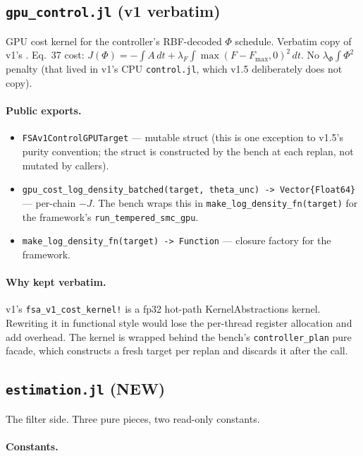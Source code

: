 \documentclass[11pt,a4paper]{article}
\begin{document}
\subsection{\texttt{gpu\_control.jl} (v1 verbatim)}

GPU cost kernel for the controller's RBF-decoded $\Phi$ schedule.
Verbatim copy of v1's . Eq.~37 cost: $J(\Phi)
= -\int A\,dt + \lambda_F \int \max(F - F_{\max}, 0)^2\,dt$. No
$\lambda_\Phi \int \Phi^2$ penalty (that lived in v1's CPU
\texttt{control.jl}, which v1.5 deliberately does not copy).

\paragraph{Public exports.}

\begin{itemize}[itemsep=2pt,leftmargin=*]
\item \texttt{FSAv1ControlGPUTarget} --- mutable struct (this is one
  exception to v1.5's purity convention; the struct is constructed
  by the bench at each replan, not mutated by callers).
\item \texttt{gpu\_cost\_log\_density\_batched(target, theta\_unc)
  -> Vector\{Float64\}} --- per-chain $-J$. The bench wraps this in
  \texttt{make\_log\_density\_fn(target)} for the framework's
  \texttt{run\_tempered\_smc\_gpu}.
\item \texttt{make\_log\_density\_fn(target) -> Function} --- closure
  factory for the framework.
\end{itemize}

\paragraph{Why kept verbatim.} v1's
\texttt{fsa\_v1\_cost\_kernel!} is a fp32 hot-path KernelAbstractions
kernel. Rewriting it in functional style would lose the per-thread
register allocation and add overhead. The kernel is wrapped behind
the bench's \texttt{controller\_plan} pure facade, which constructs
a fresh target per replan and discards it after the call.

\subsection{\texttt{estimation.jl} (NEW)}

The filter side. Three pure pieces, two read-only constants.

\paragraph{Constants.}
\end{document}
